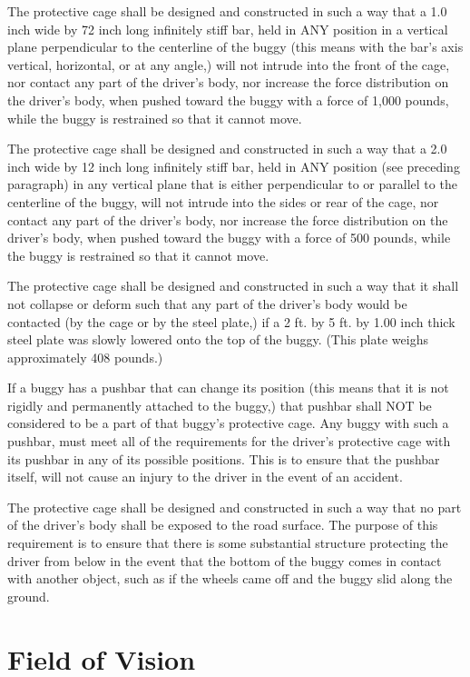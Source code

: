 	The protective cage shall be designed and constructed in such a way that a 1.0
	inch wide by 72 inch long infinitely stiff bar, held in ANY position in a
	vertical plane perpendicular to the centerline of the buggy (this means with
	the bar's axis vertical, horizontal, or at any angle,) will not intrude into
	the front of the cage, nor contact any part of the driver's body, nor increase
	the force distribution on the driver's body, when pushed toward the buggy with
	a force of 1,000 pounds, while the buggy is restrained so that it cannot move.

	The protective cage shall be designed and constructed in such a way that a 2.0
	inch wide by 12 inch long infinitely stiff bar, held in ANY position (see
	preceding paragraph) in any vertical plane that is either perpendicular to or
	parallel to the centerline of the buggy, will not intrude into the sides or
	rear of the cage, nor contact any part of the driver's body, nor increase the
	force distribution on the driver's body, when pushed toward the buggy with a
	force of 500 pounds, while the buggy is restrained so that it cannot move.

	The protective cage shall be designed and constructed in such a way that it
	shall not collapse or deform such that any part of the driver's body would be
	contacted (by the cage or by the steel plate,) if a 2 ft. by 5 ft. by 1.00 inch
	thick steel plate was slowly lowered onto the top of the buggy. (This plate
	weighs approximately 408 pounds.)

	If a buggy has a pushbar that can change its position (this means that it is
	not rigidly and permanently attached to the buggy,) that pushbar shall NOT be
	considered to be a part of that buggy's protective cage. Any buggy with such a
	pushbar, must meet all of the requirements for the driver's protective cage
	with its pushbar in any of its possible positions. This is to ensure that the
	pushbar itself, will not cause an injury to the driver in the event of an
	accident.

	The protective cage shall be designed and constructed in such a way that no
	part of the driver's body shall be exposed to the road surface. The purpose of
	this requirement is to ensure that there is some substantial structure
	protecting the driver from below in the event that the bottom of the buggy
	comes in contact with another object, such as if the wheels came off and the
	buggy slid along the ground.

\section{Field of Vision}

